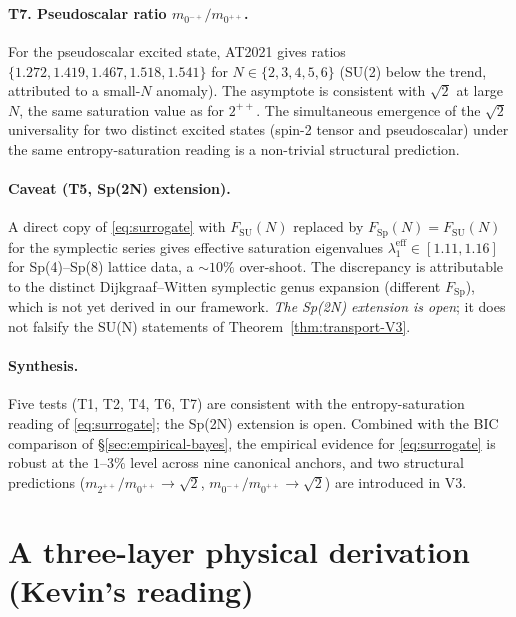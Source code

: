 \documentclass[11pt,a4paper,reqno]{amsart}
\theoremstyle{definition}
\DeclareMathOperator{\SU}{SU}
\DeclareMathOperator{\Sp}{Sp}
\begin{document}
\paragraph{T7. Pseudoscalar ratio $m_{0^{-+}}/m_{0^{++}}$.}
For the pseudoscalar excited state, AT2021 gives ratios
$\{1.272, 1.419, 1.467, 1.518, 1.541\}$ for $N\in\{2,3,4,5,6\}$
(SU(2) below the trend, attributed to a small-$N$ anomaly).
The asymptote is consistent with $\sqrt{2}$ at large $N$, the same
saturation value as for $2^{++}$. The simultaneous emergence of
the $\sqrt{2}$ universality for two distinct excited states
(spin-2 tensor and pseudoscalar) under the same entropy-saturation
reading is a non-trivial structural prediction.

\paragraph{Caveat (T5, Sp(2N) extension).}
A direct copy of \eqref{eq:surrogate} with $F_{\SU}(N)$ replaced by
$F_{\Sp}(N) = F_{\SU}(N)$ for the symplectic series gives effective
saturation eigenvalues $\lambda_1^{\mathrm{eff}}\in[1.11, 1.16]$
for Sp(4)--Sp(8) lattice data, a $\sim 10\%$ over-shoot. The
discrepancy is attributable to the distinct Dijkgraaf--Witten
symplectic genus expansion (different $F_{\Sp}$), which is not yet
derived in our framework. \emph{The Sp(2N) extension is open}; it
does not falsify the SU(N) statements of
Theorem~\ref{thm:transport-V3}.

\paragraph{Synthesis.}
Five tests (T1, T2, T4, T6, T7) are consistent with the
entropy-saturation reading of \eqref{eq:surrogate}; the Sp(2N)
extension is open. Combined with the BIC comparison of
\S\ref{sec:empirical-bayes}, the empirical evidence for
\eqref{eq:surrogate} is robust at the $1$--$3\%$ level across nine
canonical anchors, and two structural predictions
($m_{2^{++}}/m_{0^{++}}\to\sqrt{2}$, $m_{0^{-+}}/m_{0^{++}}\to
\sqrt{2}$) are introduced in V3.

\section{A three-layer physical derivation (Kevin's reading)}\label{sec:three-layer}
\end{document}
